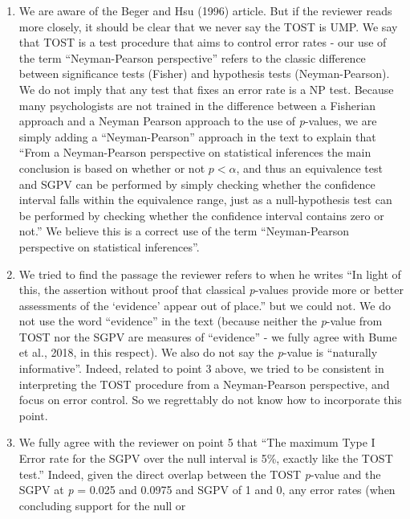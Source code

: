 \documentclass[man]{apa6}
\begin{document}
\begin{enumerate}
\def\labelenumi{\arabic{enumi}.}
\setcounter{enumi}{2}
\item
  We are aware of the Beger and Hsu (1996) article. But if the reviewer
  reads more closely, it should be clear that we never say the TOST is
  UMP. We say that TOST is a test procedure that aims to control error
  rates - our use of the term \enquote{Neyman-Pearson perspective}
  refers to the classic difference between significance tests (Fisher)
  and hypothesis tests (Neyman-Pearson). We do not imply that any test
  that fixes an error rate is a NP test. Because many psychologists are
  not trained in the difference between a Fisherian approach and a
  Neyman Pearson approach to the use of \emph{p}-values, we are simply
  adding a \enquote{Neyman-Pearson} approach in the text to explain that
  \enquote{From a Neyman-Pearson perspective on statistical inferences
  the main conclusion is based on whether or not \(p < \alpha\), and
  thus an equivalence test and SGPV can be performed by simply checking
  whether the confidence interval falls within the equivalence range,
  just as a null-hypothesis test can be performed by checking whether
  the confidence interval contains zero or not.} We believe this is a
  correct use of the term \enquote{Neyman-Pearson perspective on
  statistical inferences}.
\item
  We tried to find the passage the reviewer refers to when he writes
  \enquote{In light of this, the assertion without proof that classical
  \emph{p}-values provide more or better assessments of the
  \enquote{evidence} appear out of place.} but we could not. We do not
  use the word \enquote{evidence} in the text (because neither the
  \emph{p}-value from TOST nor the SGPV are measures of
  \enquote{evidence} - we fully agree with Bume et al., 2018, in this
  respect). We also do not say the \emph{p}-value is \enquote{naturally
  informative}. Indeed, related to point 3 above, we tried to be
  consistent in interpreting the TOST procedure from a Neyman-Pearson
  perspective, and focus on error control. So we regrettably do not know
  how to incorporate this point.
\item
  We fully agree with the reviewer on point 5 that \enquote{The maximum
  Type I Error rate for the SGPV over the null interval is 5\%, exactly
  like the TOST test.} Indeed, given the direct overlap between the TOST
  \emph{p}-value and the SGPV at \emph{p} = 0.025 and 0.0975 and SGPV of
  1 and 0, any error rates (when concluding support for the null or

\end{enumerate}
\end{document}
